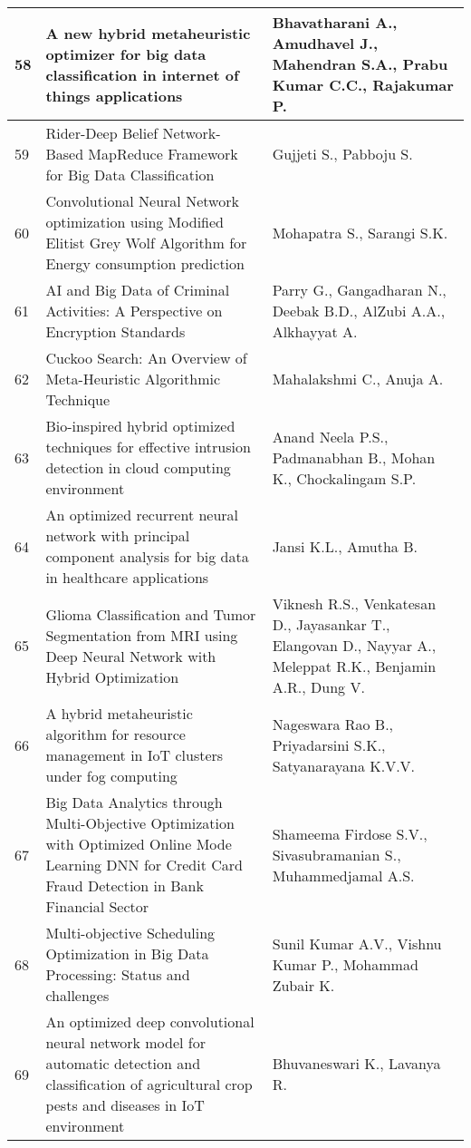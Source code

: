 \begin{landscape}
\begin{longtable}{|p{0.5cm}|p{9cm}|p{7cm}|}
    \hline
    58 & A new hybrid metaheuristic optimizer for big data classification in internet of things applications & Bhavatharani A., Amudhavel J., Mahendran S.A., Prabu Kumar C.C., Rajakumar P. \\
    \hline
    59 & Rider-Deep Belief Network-Based MapReduce Framework for Big Data Classification & Gujjeti S., Pabboju S. \\
    \hline
    60 & Convolutional Neural Network optimization using Modified Elitist Grey Wolf Algorithm for Energy consumption prediction & Mohapatra S., Sarangi S.K. \\
    \hline
    61 & AI and Big Data of Criminal Activities: A Perspective on Encryption Standards & Parry G., Gangadharan N., Deebak B.D., AlZubi A.A., Alkhayyat A. \\
    \hline
    62 & Cuckoo Search: An Overview of Meta-Heuristic Algorithmic Technique & Mahalakshmi C., Anuja A. \\
    \hline
    63 & Bio-inspired hybrid optimized techniques for effective intrusion detection in cloud computing environment & Anand Neela P.S., Padmanabhan B., Mohan K., Chockalingam S.P. \\
    \hline
    64 & An optimized recurrent neural network with principal component analysis for big data in healthcare applications & Jansi K.L., Amutha B. \\
    \hline
    65 & Glioma Classification and Tumor Segmentation from MRI using Deep Neural Network with Hybrid Optimization & Viknesh R.S., Venkatesan D., Jayasankar T., Elangovan D., Nayyar A., Meleppat R.K., Benjamin A.R., Dung V. \\
    \hline
    66 & A hybrid metaheuristic algorithm for resource management in IoT clusters under fog computing & Nageswara Rao B., Priyadarsini S.K., Satyanarayana K.V.V. \\
    \hline
    67 & Big Data Analytics through Multi-Objective Optimization with Optimized Online Mode Learning DNN for Credit Card Fraud Detection in Bank Financial Sector & Shameema Firdose S.V., Sivasubramanian S., Muhammedjamal A.S. \\
    \hline
    68 & Multi-objective Scheduling Optimization in Big Data Processing: Status and challenges & Sunil Kumar A.V., Vishnu Kumar P., Mohammad Zubair K. \\
    \hline
    69 & An optimized deep convolutional neural network model for automatic detection and classification of agricultural crop pests and diseases in IoT environment & Bhuvaneswari K., Lavanya R. \\

\end{longtable}
\end{landscape}
